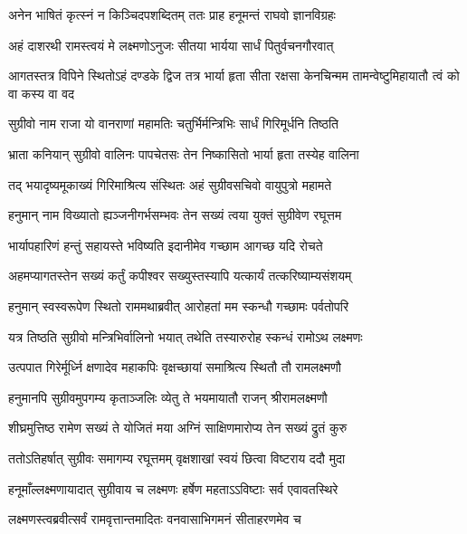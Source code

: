 \twolineshloka
{अनेन भाषितं कृत्स्नं न किञ्चिदपशब्दितम्}
{ततः प्राह हनूमन्तं राघवो ज्ञानविग्रहः} %

\twolineshloka
{अहं दाशरथी रामस्त्वयं मे लक्ष्मणोऽनुजः}
{सीतया भार्यया सार्धं पितुर्वचनगौरवात्} %

\threelineshloka
{आगतस्तत्र विपिने स्थितोऽहं दण्डके द्विज}
{तत्र भार्या हृता सीता रक्षसा केनचिन्मम}
{तामन्वेष्टुमिहायातौ त्वं को वा कस्य वा वद} %


\twolineshloka
{सुग्रीवो नाम राजा यो वानराणां महामतिः}
{चतुर्भिर्मन्त्रिभिः सार्धं गिरिमूर्धनि तिष्ठति} %

\twolineshloka
{भ्राता कनियान् सुग्रीवो वालिनः पापचेतसः}
{तेन निष्कासितो भार्या हृता तस्येह वालिना} %

\twolineshloka
{तद् भयादृष्यमूकाख्यं गिरिमाश्रित्य संस्थितः}
{अहं सुग्रीवसचिवो वायुपुत्रो महामते} %

\twolineshloka
{हनुमान् नाम विख्यातो ह्यञ्जनीगर्भसम्भवः}
{तेन सख्यं त्वया युक्तं सुग्रीवेण रघूत्तम} %

\twolineshloka
{भार्यापहारिणं हन्तुं सहायस्ते भविष्यति}
{इदानीमेव गच्छाम आगच्छ यदि रोचते} %


\twolineshloka
{अहमप्यागतस्तेन सख्यं कर्तुं कपीश्वर}
{सख्युस्तस्यापि यत्कार्यं तत्करिष्याम्यसंशयम्} %

\twolineshloka
{हनुमान् स्वस्वरूपेण स्थितो राममथाब्रवीत्}
{आरोहतां मम स्कन्धौ गच्छामः पर्वतोपरि} %

\twolineshloka
{यत्र तिष्ठति सुग्रीवो मन्त्रिभिर्वालिनो भयात्}
{तथेति तस्यारुरोह स्कन्धं रामोऽथ लक्ष्मणः} %

\twolineshloka
{उत्पपात गिरेर्मूर्ध्नि क्षणादेव महाकपिः}
{वृक्षच्छायां समाश्रित्य स्थितौ तौ रामलक्ष्मणौ} %

\twolineshloka
{हनुमानपि सुग्रीवमुपगम्य कृताञ्जलिः}
{व्येतु ते भयमायातौ राजन् श्रीरामलक्ष्मणौ} %

\twolineshloka
{शीघ्रमुत्तिष्ठ रामेण सख्यं ते योजितं मया}
{अग्निं साक्षिणमारोप्य तेन सख्यं द्रुतं कुरु} %

\twolineshloka
{ततोऽतिहर्षात् सुग्रीवः समागम्य रघूत्तमम्}
{वृक्षशाखां स्वयं छित्वा विष्टराय ददौ मुदा} %

\twolineshloka
{हनूमाँल्लक्ष्मणायादात् सुग्रीवाय च लक्ष्मणः}
{हर्षेण महताऽऽविष्टाः सर्व एवावतस्थिरे} %

\twolineshloka
{लक्ष्मणस्त्वब्रवीत्सर्वं रामवृत्तान्तमादितः}
{वनवासाभिगमनं सीताहरणमेव च} %


